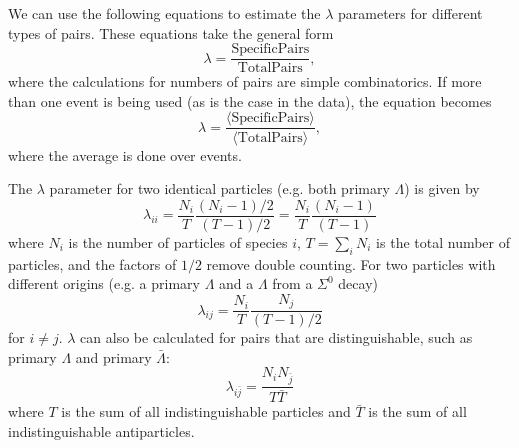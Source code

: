 We can use the following equations to estimate the $\lambda$ parameters for different types of pairs. 
These equations take the general form 
\begin{equation}
\lambda = \frac{\mathrm{Specific Pairs}}{\mathrm{Total Pairs}},
\end{equation}
where the calculations for numbers of pairs are simple combinatorics.  If more than one event is being used (as is the case in the data), the equation becomes
\begin{equation}
\lambda = \frac{\langle\mathrm{Specific Pairs}\rangle}{\langle\mathrm{Total Pairs}\rangle},
\end{equation}
where the average is done over events.

The $\lambda$ parameter for two identical particles (e.g. both primary $\Lambda$) is given by
\begin{equation}
\label{eq:LambdaIdentical}
\lambda_{ii} = \frac{N_i}{T}\frac{(N_i -1)/2}{(T-1)/2} = \frac{N_i}{T}\frac{(N_i -1)}{(T-1)}
\end{equation}
where $N_i$ is the number of particles of species $i$, $T = \sum\limits_i N_i$ is the total number of particles, and the factors of $1/2$ remove double counting.  
For two particles with different origins (e.g. a primary $\Lambda$ and a $\Lambda$ from a $\Sigma^0$ decay)
\begin{equation}
\lambda_{ij} = \frac{N_i}{T} \frac{N_j}{(T-1)/2}
\end{equation}
for $i \neq j$.  
$\lambda$ can also be calculated for pairs that are distinguishable, such as primary $\Lambda$ and primary $\bar{\Lambda}$:
\begin{equation}
\lambda_{i\bar{j}} = \frac{N_i N_{\bar{j}}}{T\bar{T}}
\end{equation}
where $T$ is the sum of all indistinguishable particles and $\bar{T}$ is the sum of all indistinguishable antiparticles.



